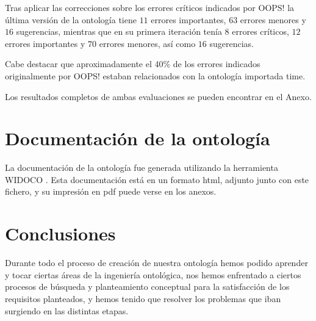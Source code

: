 \documentclass[a4paper,12pt]{article}
\begin{document}
	Tras aplicar las correcciones sobre los errores críticos indicados por OOPS! la última versión de la ontología tiene $11$ errores importantes, $63$ errores menores y $16$ sugerencias, mientras que en su primera iteración tenía $8$ errores críticos, $12$ errores importantes y $70$ errores menores, así como $16$ sugerencias.
	
	Cabe destacar que aproximadamente el 40\% de los errores indicados originalmente por OOPS! estaban relacionados con la ontología importada time.
	
	Los resultados completos de ambas evaluaciones se pueden encontrar en el Anexo.
	
	\section{Documentación de la ontología}
	La documentación de la ontología fue generada utilizando la herramienta WIDOCO \cite{widoco}. Esta documentación está en un formato html, adjunto junto con este fichero, y su impresión en pdf puede verse en los anexos.
	
	\section{Conclusiones}
	Durante todo el proceso de creación de nuestra ontología hemos podido aprender y tocar ciertas
áreas de la ingeniería ontológica, nos hemos enfrentado a ciertos procesos de búsqueda y
planteamiento conceptual para la satisfacción de los requisitos planteados, y hemos tenido que
resolver los problemas que iban surgiendo en las distintas etapas.
	
\end{document}
